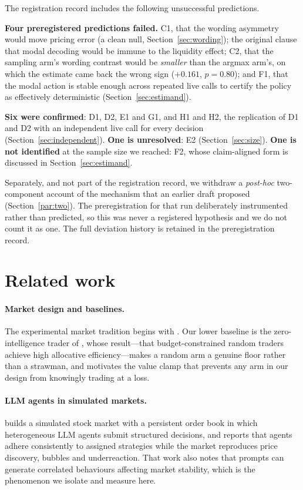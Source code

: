 \documentclass[11pt]{article}
\begin{document}
The registration record includes the following unsuccessful predictions.

\textbf{Four preregistered predictions failed.} C1, that the wording asymmetry
would move pricing error (a clean null, Section~\ref{sec:wording}); the
original clause that modal decoding would be immune to the liquidity effect;
C2, that the sampling arm's wording contrast would be \emph{smaller} than the
argmax arm's, on which the estimate came back the wrong sign ($+0.161$,
$p=0.80$); and F1, that the modal action is stable enough across repeated live
calls to certify the policy as effectively deterministic
(Section~\ref{sec:estimand}).

\textbf{Six were confirmed}: D1, D2, E1 and G1, and H1 and H2, the
replication of D1 and D2 with an independent live call for every decision
(Section~\ref{sec:independent}). \textbf{One is unresolved}: E2
(Section~\ref{sec:size}). \textbf{One is not identified} at the sample size we
reached: F2, whose claim-aligned form is discussed in
Section~\ref{sec:estimand}.

Separately, and not part of the registration record, we withdraw a
\emph{post-hoc} two-component account of the mechanism that an earlier draft
proposed (Section~\ref{par:two}). The preregistration for that run deliberately
instrumented rather than predicted, so this was never a registered hypothesis
and we do not count it as one. The full deviation history is retained in the
preregistration record.

\section{Related work}

\paragraph{Market design and baselines.} The experimental market tradition
begins with \citet{smith1962}. Our lower baseline is the zero-intelligence
trader of \citet{gode1993}, whose result---that budget-constrained random
traders achieve high allocative efficiency---makes a random arm a genuine floor
rather than a strawman, and motivates the value clamp that prevents any arm in
our design from knowingly trading at a loss.

\paragraph{LLM agents in simulated markets.} \citet{lopezlira2025} builds a
simulated stock market with a persistent order book in which heterogeneous LLM
agents submit structured decisions, and reports that agents adhere consistently
to assigned strategies while the market reproduces price discovery, bubbles and
underreaction. That work also notes that prompts can generate correlated
behaviours affecting market stability, which is the phenomenon we isolate and
measure here.
\end{document}
